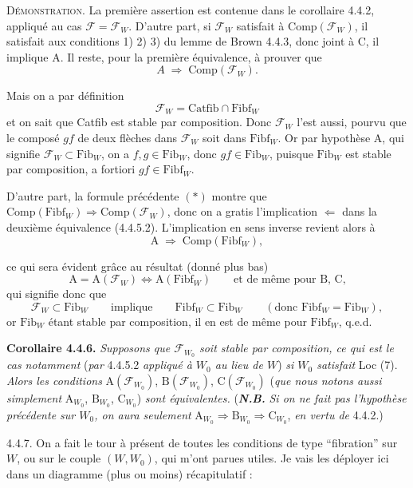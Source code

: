 \documentclass[11pt]{article}
\newcommand{\printedpage}[1]{\marginpar{\footnotesize p.~#1}}
\newcommand{\msp}[1]{\marginpar{\footnotesize [#1]}}
\newcommand{\Fib}{\mathrm{Fib}}
\newcommand{\Fibf}{\mathrm{Fibf}}
\newcommand{\Catfib}{\mathrm{Catfib}}
\newcommand{\cF}{\mathcal{F}}
\newcommand{\Comp}{\mathrm{Comp}}
\begin{document}
\printedpage{27}

\textsc{Démonstration}. La première assertion est contenue dans le corollaire 4.4.2, appliqué au cas $\cF = \cF_W$. D'autre part, si $\cF_W$ satisfait à $\Comp(\cF_W)$, il satisfait aux conditions 1) 2) 3) du lemme de Brown 4.4.3, donc joint à C, il implique A. Il reste, pour la première équivalence, à prouver que
\[
A \;\Longrightarrow\; \Comp(\cF_W).
\]

\msp{page 46}

Mais on a par définition
\[
\cF_W = \Catfib \cap \Fibf_W
\tag*{$(*)$}
\]
et on sait que Catfib est stable par composition. Donc $\cF_W$ l'est aussi, pourvu que le composé $gf$ de deux flèches dans $\cF_W$ soit dans $\Fibf_W$. Or par hypothèse A, qui signifie $\cF_W \subset \Fib_W$, on a $f, g \in \Fib_W$, donc $gf \in \Fib_W$, puisque $\Fib_W$ est stable par composition, a fortiori $gf \in \Fibf_W$.

D'autre part, la formule précédente $(*)$ montre que $\Comp(\Fibf_W) \Longrightarrow \Comp(\cF_W)$, donc on a gratis l'implication $\Longleftarrow$ dans la deuxième équivalence (4.4.5.2). L'implication en sens inverse revient alors à
\[
\mathrm{A} \;\Longrightarrow\; \Comp(\Fibf_W),
\]

\msp{page 47}

ce qui sera évident grâce au résultat (donné plus bas)
\[
\mathrm{A} = \mathrm{A}(\cF_W) \iff \mathrm{A}(\Fibf_W) \qquad \text{et de même pour B, C,}
\]
qui signifie donc que
\[
\cF_W \subset \Fib_W \qquad \text{implique} \qquad \Fibf_W \subset \Fib_W \qquad (\text{donc } \Fibf_W = \Fib_W),
\]
or $\Fib_W$ étant stable par composition, il en est de même pour $\Fibf_W$, q.e.d.

\textbf{Corollaire 4.4.6.} \textit{Supposons que $\cF_{W_0}$ soit stable par composition, ce qui est le cas notamment} (\textit{par} 4.4.5.2 \textit{appliqué à $W_0$ au lieu de $W$}) \textit{si $W_0$ satisfait} Loc (7). \textit{Alors les conditions} $\mathrm{A}(\cF_{W_0})$, $\mathrm{B}(\cF_{W_0})$, $\mathrm{C}(\cF_{W_0})$ (\textit{que nous notons aussi simplement} $\mathrm{A}_{W_0}$, $\mathrm{B}_{W_0}$, $\mathrm{C}_{W_0}$) \textit{sont équivalentes.} (\textbf{\textit{N.B.}} \textit{Si on ne fait pas l'hypothèse précédente sur $W_0$, on aura seulement} $\mathrm{A}_{W_0} \Longrightarrow \mathrm{B}_{W_0} \Longrightarrow \mathrm{C}_{W_0}$, \textit{en vertu de} 4.4.2.)

4.4.7. On a fait le tour à présent de toutes les conditions de type “fibration” sur $W$, ou sur le couple $(W, W_0)$, qui m'ont parues utiles. Je vais les déployer ici dans un diagramme (plus ou moins) récapitulatif : %
\end{document}
